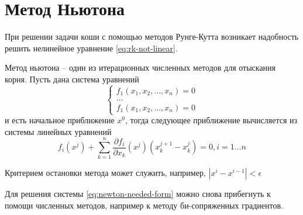 \section{Метод Ньютона}
При решении задачи коши с помощью методов Рунге-Кутта возникает надобность
решить нелинейное уравнение \ref{eq:rk-not-linear}.

Метод ньютона -- один из итерационных численных методов для отыскания корня.
Пусть дана система уравнений
\begin{equation}\label{eq:newton-needed-form}
    \begin{cases}
        f_1(x_1, x_2,\dots, x_n) = 0\\
        \dots\\
        f_1(x_1, x_2,\dots, x_n) = 0
    \end{cases}
\end{equation}
и есть начальное приближение $x^{0}$, тогда следующее приближение вычисляется
из системы линейных уравнений
\begin{equation}\label{eq:newton-generalized-iteration}
    f_i(x^j) + \sum_{k=1}^n \frac{\partial f_i}{\partial x_k}(x^j)
    (x_k^{j+1}-x_k^{j}) = 0,  i=1\dots n
\end{equation}

Критерием остановки метода может служить, например, $|x^i - x^{i-1}|<\epsilon$

Для решения системы \ref{eq:newton-needed-form} можно снова прибегнуть к помощи
численных методов, например к методу би-сопряженных градиентов.

